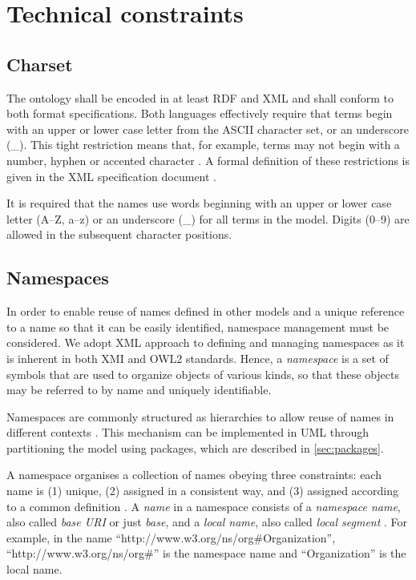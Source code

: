 \section{Technical constraints}
\label{sec:technical}
	
	
	\subsection{Charset}
	\label{sec:charset}
	
	
	The ontology shall be encoded in at least RDF \cite{rdf11} and XML\cite{xml1-spec} and shall conform to both format specifications. Both languages effectively require that terms begin with an upper or lower case letter from the ASCII character set, or an underscore (\_). This tight restriction means that, for example, terms may not begin with a number, hyphen or accented character \cite{d3.1-2015}. A formal definition of these restrictions is given in the XML specification document \cite{xml1-spec}.
	
	It is required that the names use words beginning with an upper or lower case letter (A--Z, a--z) or an underscore (\_) for all terms in the model. Digits (0--9) are allowed in the subsequent character positions.
	
	\subsection{Namespaces}
	\label{sec:namespaces}
	
	In order to enable reuse of names defined in other models and a unique reference to a name so that it can be easily identified, namespace management must be considered. We adopt XML approach to defining and managing namespaces as it is inherent in both XMI and OWL2 standards. Hence, a \textit{namespace} is a set of symbols that are used to organize objects of various kinds, so that these objects may be referred to by name and uniquely identifiable. 
	
	Namespaces are commonly structured as hierarchies to allow reuse of names in different contexts \cite{xml-namespaces}. This mechanism can be implemented in UML through partitioning the model using packages, which are described in \ref{sec:packages}.
	
	A namespace organises a collection of names obeying three constraints:
	each name is (1) unique, (2) assigned in a consistent way, and (3)
	assigned according to a common definition \cite{urn-rfc8141}. A \textit{name} in a namespace consists of a \textit{namespace name}, also called \textit{base URI} or just \textit{base}, and a \textit{local name}, also called \textit{local segment} \cite{xml1-spec,urn-rfc2141}. For example, in the name ``http://www.w3.org/ns/org\#Organization'', ``http://www.w3.org/ns/org\#'' is the namespace name and ``Organization'' is the local name. 
	
